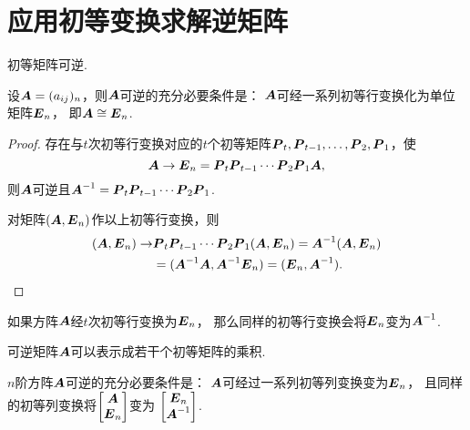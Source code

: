 \section{应用初等变换求解逆矩阵}
\begin{property}\label{theorem:逆矩阵.初等矩阵的性质3}
初等矩阵可逆.
\end{property}

\begin{theorem}\label{theorem:逆矩阵.可逆矩阵与初等矩阵的关系}
设\(\boldsymbol{A}=(a_{ij})_n\)，则\(\boldsymbol{A}\)可逆的充分必要条件是：
\(\boldsymbol{A}\)可经一系列初等行变换化为单位矩阵\(\boldsymbol{E}_n\)，
即\(\boldsymbol{A} \cong \boldsymbol{E}_n\).
\begin{proof}
\def\Ps{\vb{P}_t \vb{P}_{t-1} \dotsm \vb{P}_2 \vb{P}_1}
存在与\(t\)次初等行变换对应的\(t\)个初等矩阵\(\boldsymbol{P}_t,\boldsymbol{P}_{t-1},\dotsc,\boldsymbol{P}_2,\boldsymbol{P}_1\)，使\[
	\vb{A} \to \vb{E}_n = \Ps \vb{A},
\]
则\(\boldsymbol{A}\)可逆且\(\vb{A}^{-1} = \Ps\).

对矩阵\((\boldsymbol{A},\boldsymbol{E}_n)\)作以上初等行变换，则\begin{align*}
	(\vb{A},\vb{E}_n) \to &\Ps(\vb{A},\vb{E}_n) = \vb{A}^{-1}(\vb{A},\vb{E}_n) \\
	&= (\vb{A}^{-1}\vb{A},\vb{A}^{-1}\vb{E}_n) = (\vb{E}_n,\vb{A}^{-1}).
	\qedhere
\end{align*}
\end{proof}
\end{theorem}

\begin{corollary}\label{theorem:逆矩阵.计算逆矩阵的方法}
如果方阵\(\boldsymbol{A}\)经\(t\)次初等行变换为\(\boldsymbol{E}_n\)，
那么同样的初等行变换会将\(\boldsymbol{E}_n\)变为\(\boldsymbol{A}^{-1}\).
\end{corollary}

\begin{corollary}
可逆矩阵\(\boldsymbol{A}\)可以表示成若干个初等矩阵的乘积.
\end{corollary}

\begin{corollary}
\(n\)阶方阵\(\boldsymbol{A}\)可逆的充分必要条件是：
\(\boldsymbol{A}\)可经过一系列初等列变换变为\(\boldsymbol{E}_n\)，
且同样的初等列变换将\(\begin{bmatrix}\boldsymbol{A}\\\boldsymbol{E}_n\end{bmatrix}\)变为
\(\begin{bmatrix}\boldsymbol{E}_n\\\boldsymbol{A}^{-1}\end{bmatrix}\).
\end{corollary}

